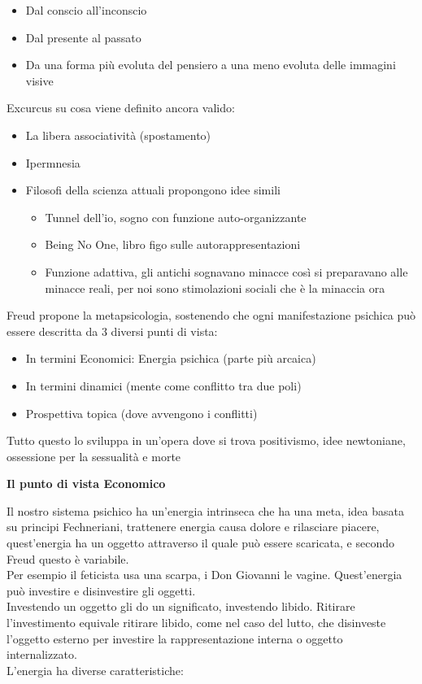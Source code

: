 \documentclass[
]{article}
\providecommand{\tightlist}{%
  \setlength{\itemsep}{0pt}\setlength{\parskip}{0pt}}
\begin{document}
\begin{itemize}
\tightlist
\item
  Dal conscio all'inconscio
\item
  Dal presente al passato
\item
  Da una forma più evoluta del pensiero a una meno evoluta delle
  immagini visive
\end{itemize}

Excurcus su cosa viene definito ancora valido:

\begin{itemize}
\tightlist
\item
  La libera associatività (spostamento)
\item
  Ipermnesia
\item
  Filosofi della scienza attuali propongono idee simili

  \begin{itemize}
  \tightlist
  \item
    Tunnel dell'io, sogno con funzione auto-organizzante
  \item
    Being No One, libro figo sulle autorappresentazioni
  \item
    Funzione adattiva, gli antichi sognavano minacce così si preparavano
    alle minacce reali, per noi sono stimolazioni sociali che è la
    minaccia ora
  \end{itemize}
\end{itemize}

Freud propone la metapsicologia, sostenendo che ogni manifestazione
psichica può essere descritta da 3 diversi punti di vista:

\begin{itemize}
\tightlist
\item
  In termini Economici: Energia psichica (parte più arcaica)
\item
  In termini dinamici (mente come conflitto tra due poli)
\item
  Prospettiva topica (dove avvengono i conflitti)
\end{itemize}

Tutto questo lo sviluppa in un'opera dove si trova positivismo, idee
newtoniane, ossessione per la sessualità e morte

\textbf{Il punto di vista Economico}

Il nostro sistema psichico ha un'energia intrinseca che ha una meta,
idea basata su principi Fechneriani, trattenere energia causa dolore e
rilasciare piacere, quest'energia ha un oggetto attraverso il quale può
essere scaricata, e secondo Freud questo è variabile.\\
Per esempio il feticista usa una scarpa, i Don Giovanni le vagine.
Quest'energia può investire e disinvestire gli oggetti.\\
Investendo un oggetto gli do un significato, investendo libido. Ritirare
l'investimento equivale ritirare libido, come nel caso del lutto, che
disinveste l'oggetto esterno per investire la rappresentazione interna o
oggetto internalizzato.\\
L'energia ha diverse caratteristiche:
\end{document}
